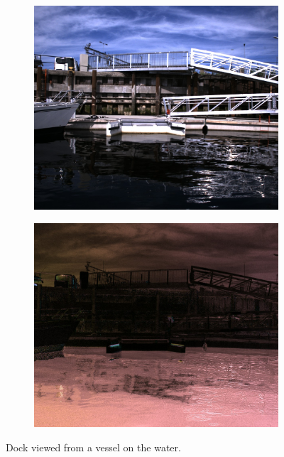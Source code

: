 \begin{figure}[H]
    \begin{subfigure}[T]{.49\textwidth}
        \includegraphics[width=\textwidth]{figures/pictures/img_11640_s0.jpg}
    \end{subfigure} \hfill
    \begin{subfigure}[T]{.49\textwidth}
        \includegraphics[width=\textwidth]{figures/pictures/img_11640_pol.jpg}
    \end{subfigure}
    \caption{Dock viewed from a vessel on the water.}
\end{figure}
\vspace{-.5cm}

